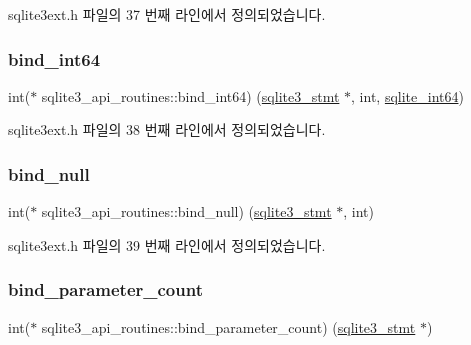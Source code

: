sqlite3ext.\+h 파일의 37 번째 라인에서 정의되었습니다.

\mbox{\label{structsqlite3__api__routines_ac71b110c165973291cc257973e7d6243}} 
\subsubsection{\texorpdfstring{bind\+\_\+int64}{bind\_int64}}
{\footnotesize\ttfamily int($\ast$ sqlite3\+\_\+api\+\_\+routines\+::bind\+\_\+int64) (\hyperlink{sqlite3_8h_af2a033da1327cdd77f0a174a09aedd0c}{sqlite3\+\_\+stmt} $\ast$, int, \hyperlink{sqlite3_8h_a520a95f9080c018b2fade39885bd2e2a}{sqlite\+\_\+int64})}



sqlite3ext.\+h 파일의 38 번째 라인에서 정의되었습니다.

\mbox{\label{structsqlite3__api__routines_a78d546c352de656db3c15e7cc6255228}} 
\subsubsection{\texorpdfstring{bind\+\_\+null}{bind\_null}}
{\footnotesize\ttfamily int($\ast$ sqlite3\+\_\+api\+\_\+routines\+::bind\+\_\+null) (\hyperlink{sqlite3_8h_af2a033da1327cdd77f0a174a09aedd0c}{sqlite3\+\_\+stmt} $\ast$, int)}



sqlite3ext.\+h 파일의 39 번째 라인에서 정의되었습니다.

\mbox{\label{structsqlite3__api__routines_acd345a944505eb7928568f01d7a4fe5a}} 
\subsubsection{\texorpdfstring{bind\+\_\+parameter\+\_\+count}{bind\_parameter\_count}}
{\footnotesize\ttfamily int($\ast$ sqlite3\+\_\+api\+\_\+routines\+::bind\+\_\+parameter\+\_\+count) (\hyperlink{sqlite3_8h_af2a033da1327cdd77f0a174a09aedd0c}{sqlite3\+\_\+stmt} $\ast$)}



